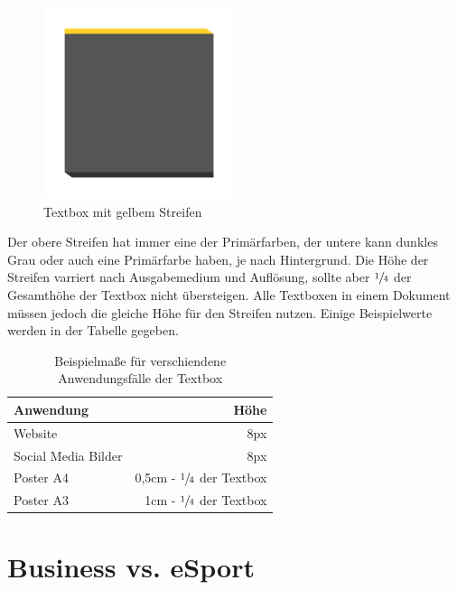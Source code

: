 \documentclass{article}
\begin{document}
\begin{figure}[H]
\begin{center}
\includegraphics[width=0.5\textwidth]{Docs/textbox.png}
\end{center}
\caption{Textbox mit gelbem Streifen}
\end{figure}

Der obere Streifen hat immer eine der Primärfarben, der untere kann dunkles Grau oder auch eine Primärfarbe haben, je nach Hintergrund.
Die Höhe der Streifen varriert nach Ausgabemedium und Auflösung, sollte aber $\sfrac{1}{4}$ der Gesamthöhe der Textbox nicht übersteigen.
Alle Textboxen in einem Dokument müssen jedoch die gleiche Höhe für den Streifen nutzen.
Einige Beispielwerte werden in der Tabelle gegeben.

\begin{table}[H]
\begin{center}
\begin{tabular}{ | l | r | }
\hline
  \textbf{Anwendung} & \textbf{Höhe} \\
\hline
  Website & 8px \\
\hline
  Social Media Bilder & 8px \\
\hline
  Poster A4 & 0,5cm - $\sfrac{1}{4}$ der Textbox \\
\hline
  Poster A3 & 1cm - $\sfrac{1}{4}$ der Textbox \\
\hline
\end{tabular}
\end{center}
\caption{Beispielmaße für verschiendene Anwendungsfälle der Textbox}
\end{table}


\cleardoublepage
\section{Business vs. eSport}
\end{document}

